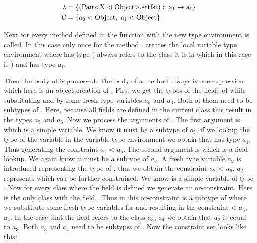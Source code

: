 \begin{align*}
    \lambda &= \{ ( \text{Pair} \text{<} \text{X} \vartriangleleft \text{Object} \text{>}. \text{setfst} ): \ \text{a}_1 \to \text{a}_0 \}\\
    \text{C} &= \{ \text{a}_0 < \text{Object}, \ \text{a}_1 < \text{Object} \}\\
\end{align*}

Next for every method defined in  the function  with the new type environment is called.
In this case only once for the method .  creates the local variable type environment where  has type  ( always refers to the class it is in which in this case is ) and  has type $a_1$.

Then the body of  is processed. The body of a method always is one expression which here is an object creation of .
First we get the types of the fields of  while substituting  and  by some fresh type variables $a_5$ and $a_6$. Both of them need to be subtypes of . Here, because all fields are defined in the current class this result in the types $a_5$ and $a_6$. Now we process the arguments of .
The first argument is  which is a simple variable. We know it must be a subtype of $a_5$, if we lookup the type of the variable  in the variable type environment we obtain that  has type $a_1$. Thus generating the constraint $a_1$ < $a_5$.
The second argument is  which is a field lookup. We again know it must be a subtype of $a_6$. A fresh type variable $a_2$ is introduced representing the type of , thus we obtain the constraint $a_2$ < $a_6$.
$a_2$ represents  which can be further constrained. We know  is a simple variable of type .
Now for every class where the field  is defined we generate an or-constraint. Here  is the only class with the field . Thus in this or-constraint  is a subtype of  where we substitute some fresh type variables for  and  resulting in the constraint  < $a_3$, $a_4$\inl{>}.
In the case that the field  refers to the class $a_3$, $a_4$\inl{>} we obtain that $a_2$ is equal to $a_3$. Both $a_3$ and $a_4$ need to be subtypes of .
Now the constraint set looks like this:

